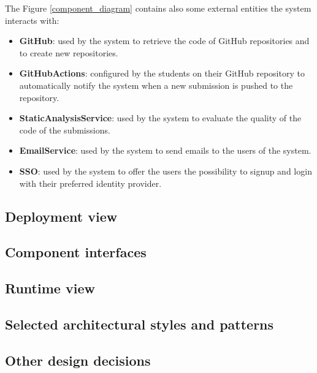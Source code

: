 The Figure \ref{component_diagram} contains also some external entities the system interacts with:
\begin{itemize}
    \item \textbf{GitHub}: used by the system to retrieve the code of GitHub repositories and to create new repositories.
    \item \textbf{GitHubActions}: configured by the students on their GitHub repository to automatically notify the system when a new submission is pushed to the repository.
    \item \textbf{StaticAnalysisService}: used by the system to evaluate the quality of the code of the submissions.
    \item \textbf{EmailService}: used by the system to send emails to the users of the system.
    \item \textbf{SSO}: used by the system to offer the users the possibility to signup and login with their preferred identity provider.
\end{itemize}



\subsection{Deployment view}
\subsection{Component interfaces}
\subsection{Runtime view}
\subsection{Selected architectural styles and patterns}
\subsection{Other design decisions}